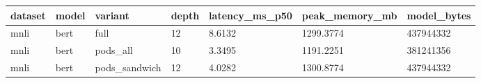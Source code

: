 \begin{tabular}{lllllll}
\hline
dataset & model & variant & depth & latency\_ms\_p50 & peak\_memory\_mb & model\_bytes \\
\hline
mnli & bert & full & 12 & 8.6132 & 1299.3774 & 437944332 \\
mnli & bert & pods\_all & 10 & 3.3495 & 1191.2251 & 381241356 \\
mnli & bert & pods\_sandwich & 12 & 4.0282 & 1300.8774 & 437944332 \\
\hline
\end{tabular}
